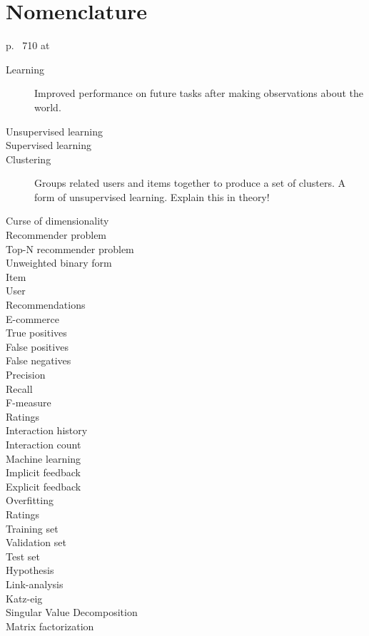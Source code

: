 \chapter{Nomenclature}\label{cha:def}

p. ~710 at \citep{norvigAI}

\begin{description}
    \item[Learning] Improved performance on future tasks after making observations about the world.

    \item[Unsupervised learning]

    \item[Supervised learning]

    \item[Clustering] Groups related users and items together to produce a set of clusters. A form of unsupervised learning. 
Explain this in theory!

    \item[Curse of dimensionality]

    \item[Recommender problem]

    \item[Top-N recommender problem]

    \item[Unweighted binary form]

    \item[Item]
    \item[User]

    \item[Recommendations]
    \item[E-commerce]
    \item[True positives]
    \item[False positives]
    \item[False negatives]
    \item[Precision]
    \item[Recall]
    \item[F-measure]
    \item[Ratings]
    \item[Interaction history]
    \item[Interaction count]
    \item[Machine learning]
    \item[Implicit feedback]
    \item[Explicit feedback]
    \item[Overfitting]
    \item[Ratings]

    \item[Training set]
    \item[Validation set]
    \item[Test set]
    \item[Hypothesis]
    \item[Link-analysis]
    \item[Katz-eig]

    \item[Singular Value Decomposition]

    \item[Matrix factorization]
\end{description}

